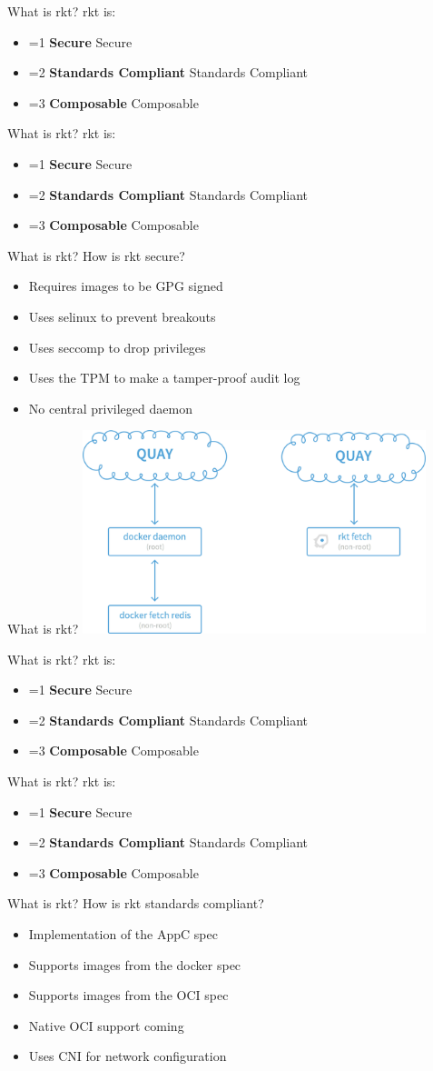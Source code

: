 \documentclass[pdf,aspectratio=169,14pt]{beamer}
\newcommand{\mbold}[3]{
    \ifnum #1=#2
        \textbf{#3}
    \else
        #3
    \fi
}
\begin{document}
\newcommand{\rktsection}[1]{
    \begin{frame}{What is rkt?}
        rkt is:
        \begin{itemize}
            \item \mbold{#1}{1}{Secure}
            \item \mbold{#1}{2}{Standards Compliant}
            \item \mbold{#1}{3}{Composable}
        \end{itemize}
    \end{frame}
}


\rktsection{0}
\rktsection{1}

\begin{frame}{What is rkt?}
    How is rkt secure?
    \begin{itemize}
        \item<2-> Requires images to be GPG signed
        \item<3-> Uses selinux to prevent breakouts
        \item<4-> Uses seccomp to drop privileges
        \item<5-> Uses the TPM to make a tamper-proof audit log
        \item<6-> No central privileged daemon
    \end{itemize}
\end{frame}

\begin{frame}{What is rkt?}
    \center \includegraphics[width=0.75\textwidth]{rkt-vs-docker-fetch}
\end{frame}


\rktsection{1}
\rktsection{2}

\begin{frame}{What is rkt?}
    How is rkt standards compliant?
    \begin{itemize}
        \item<2-> Implementation of the AppC spec
        \item<3-> Supports images from the docker spec
        \item<4-> Supports images from the OCI spec
        \item<5-> Native OCI support coming
        \item<6-> Uses CNI for network configuration
    \end{itemize}
\end{frame}
\end{document}
